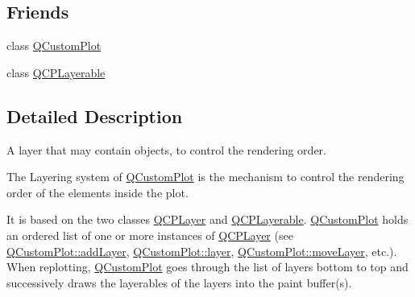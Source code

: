 \subsection*{Friends}
\begin{DoxyCompactItemize}
\item 
class \mbox{\hyperlink{class_q_c_p_layer_a1cdf9df76adcfae45261690aa0ca2198}{Q\+Custom\+Plot}}
\item 
class \mbox{\hyperlink{class_q_c_p_layer_ad655f55cccf49ba14d5172ec517e07ae}{Q\+C\+P\+Layerable}}
\end{DoxyCompactItemize}


\subsection{Detailed Description}
A layer that may contain objects, to control the rendering order. 

The Layering system of \mbox{\hyperlink{class_q_custom_plot}{Q\+Custom\+Plot}} is the mechanism to control the rendering order of the elements inside the plot.

It is based on the two classes \mbox{\hyperlink{class_q_c_p_layer}{Q\+C\+P\+Layer}} and \mbox{\hyperlink{class_q_c_p_layerable}{Q\+C\+P\+Layerable}}. \mbox{\hyperlink{class_q_custom_plot}{Q\+Custom\+Plot}} holds an ordered list of one or more instances of \mbox{\hyperlink{class_q_c_p_layer}{Q\+C\+P\+Layer}} (see \mbox{\hyperlink{class_q_custom_plot_ad5255393df078448bb6ac83fa5db5f52}{Q\+Custom\+Plot\+::add\+Layer}}, \mbox{\hyperlink{class_q_custom_plot_a0a96244e7773b242ef23c32b7bdfb159}{Q\+Custom\+Plot\+::layer}}, \mbox{\hyperlink{class_q_custom_plot_ae896140beff19424e9e9e02d6e331104}{Q\+Custom\+Plot\+::move\+Layer}}, etc.). When replotting, \mbox{\hyperlink{class_q_custom_plot}{Q\+Custom\+Plot}} goes through the list of layers bottom to top and successively draws the layerables of the layers into the paint buffer(s).

